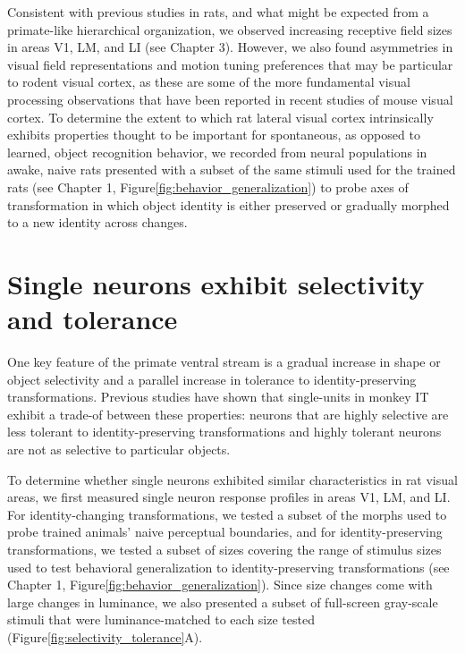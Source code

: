 Consistent with previous studies in rats, and what might be expected from a primate-like hierarchical organization, we observed increasing receptive field sizes in areas V1, LM, and LI (see Chapter 3). However, we also found asymmetries in visual field representations and motion tuning preferences that may be particular to rodent visual cortex, as these are some of the more fundamental visual processing observations that have been reported in recent studies of mouse visual cortex\cite{Liang2018, Sit2020, Murgas2020}. To determine the extent to which rat lateral visual cortex intrinsically exhibits properties thought to be important for spontaneous, as opposed to learned, object recognition behavior, we recorded from neural populations in awake, naive rats presented with a subset of the same stimuli used for the trained rats (see Chapter 1, Figure\ref{fig:behavior_generalization}) to probe axes of transformation in which object identity is either preserved or gradually morphed to a new identity across changes.

\section{Single neurons exhibit selectivity and tolerance}
One key feature of the primate ventral stream is a gradual increase in shape or object selectivity and a parallel increase in tolerance to identity-preserving transformations. Previous studies have shown that single-units in monkey IT exhibit a trade-of between these properties: neurons that are highly selective are less tolerant to identity-preserving transformations and highly tolerant neurons are not as selective to particular objects\cite{Zoccolan2007}.

To determine whether single neurons exhibited similar characteristics in rat visual areas, we first measured single neuron response profiles in areas V1, LM, and LI. For identity-changing transformations, we tested a subset of the morphs used to probe trained animals’ naive perceptual boundaries, and for identity-preserving transformations, we tested a subset of sizes covering the range of stimulus sizes used to test behavioral generalization to identity-preserving transformations (see Chapter 1, Figure\ref{fig:behavior_generalization}). Since size changes come with large changes in luminance, we also presented a subset of full-screen gray-scale stimuli that were luminance-matched to each size tested (Figure\ref{fig:selectivity_tolerance}A).

